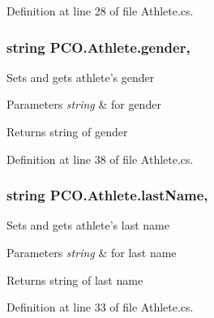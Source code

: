 Definition at line 28 of file Athlete.\+cs.

\hypertarget{classPCO_1_1Athlete_af1d423796bbb1680beb437ced0def7b4}{
\subsubsection[{gender}]{\setlength{\rightskip}{0pt plus 5cm}string P\+C\+O.\+Athlete.\+gender\hspace{0.3cm}{\ttfamily [get]}, {\ttfamily [set]}}}\label{classPCO_1_1Athlete_af1d423796bbb1680beb437ced0def7b4}
Sets and gets athlete's gender 
\begin{DoxyParams}{Parameters}
{\em string} & for gender \\
\hline
\end{DoxyParams}
\begin{DoxyReturn}{Returns}
string of gender 
\end{DoxyReturn}


Definition at line 38 of file Athlete.\+cs.

\hypertarget{classPCO_1_1Athlete_a8585d7d2291f32ef95be2934840b734a}{
\subsubsection[{last\+Name}]{\setlength{\rightskip}{0pt plus 5cm}string P\+C\+O.\+Athlete.\+last\+Name\hspace{0.3cm}{\ttfamily [get]}, {\ttfamily [set]}}}\label{classPCO_1_1Athlete_a8585d7d2291f32ef95be2934840b734a}
Sets and gets athlete's last name 
\begin{DoxyParams}{Parameters}
{\em string} & for last name \\
\hline
\end{DoxyParams}
\begin{DoxyReturn}{Returns}
string of last name 
\end{DoxyReturn}


Definition at line 33 of file Athlete.\+cs.

